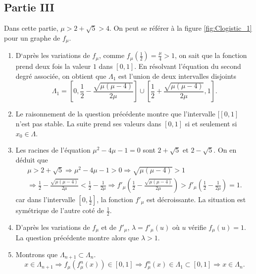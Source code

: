\subsection*{Partie III}
Dans cette partie, $\mu > 2+\sqrt{5}>4$. On peut se référer à la figure \ref{fig:Clogistic_1} pour un graphe de $f_\mu$.
\begin{enumerate}
 \item D`après les variations de $f_\mu$, comme $f_\mu(\frac{1}{2})=\frac{\mu}{4}>1$, on sait que la fonction prend deux fois la valeur $1$ dans $[0,1]$. En résolvant l'équation du second degré associée, on obtient que $\Lambda_1$ est l'union de deux intervalles disjoints
\begin{displaymath}
 \Lambda_1 = \left[ 0, \frac{1}{2}-\frac{\sqrt{\mu(\mu -4)}}{2\mu}\right]  \cup \left[ \frac{1}{2}+\frac{\sqrt{\mu(\mu -4)}}{2\mu},1\right] .
\end{displaymath}

 \item Le raisonnement de la question précédente montre que l'intervalle $[\left[ 0, 1 \right]$ n'est pas stable. La suite prend ses valeurs dans $[0,1]$ si et seulement si $x_0\in \Lambda$.
 
 \item Les racines de l'équation $\mu^2 -4\mu -1 = 0$ sont $2+\sqrt{5}$ et $2-\sqrt{5}$. On en déduit que 
\begin{multline*}
 \mu > 2+\sqrt{5} \Rightarrow \mu^2 -4\mu -1 > 0
\Rightarrow \sqrt{\mu(\mu-4)}>1 \\
\Rightarrow \frac{1}{2}-\frac{\sqrt{\mu(\mu -4)}}{2\mu} < \frac{1}{2}-\frac{1}{2\mu} 
\Rightarrow f'_\mu(\frac{1}{2}-\frac{\sqrt{\mu(\mu -4)}}{2\mu})> f'_\mu(\frac{1}{2}-\frac{1}{2\mu}) = 1 .
\end{multline*}
car dans l'intervalle $\left[ 0,\frac{1}{2} \right]$, la fonction $f'_\mu$ est décroissante. La situation est symétrique de l'autre coté de $\frac{1}{2}$.

 \item D'après les variations de $f_\mu$ et de $f'_\mu$, $\lambda = f'_\mu(u)$ où $u$ vérifie $f_\mu(u) = 1$. La question précédente montre alors que $\lambda>1$.
 
 \item Montrons que $\Lambda_{n+1} \subset \Lambda_n$. 
\begin{displaymath}
 x\in \Lambda_{n+1} \Rightarrow f_\mu(f_\mu^n(x))\in  \left[ 0, 1 \right]
\Rightarrow f_\mu^n(x) \in \Lambda_1 \subset \left[ 0, 1 \right]
\Rightarrow x\in \Lambda_n .
\end{displaymath}


\end{enumerate}
